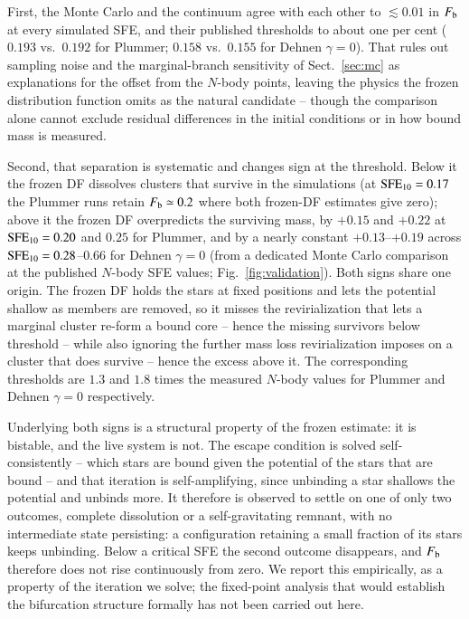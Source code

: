 \documentclass{aa}
\newcommand{\sfe}{{\rm SFE}}
\begin{document}
First, the Monte Carlo and the continuum agree with each other to
$\lesssim0.01$ in $F_{\rm b}$ at every simulated SFE, and their published
thresholds to about one per cent ($0.193$ vs.\ $0.192$ for Plummer;
$0.158$ vs.\ $0.155$ for Dehnen $\gamma=0$). That rules out sampling
noise and the marginal-branch sensitivity of Sect.~\ref{sec:mc} as
explanations for the offset from the $N$-body points, leaving the physics
the frozen distribution function omits as the natural candidate -- though
the comparison alone cannot exclude residual differences in the initial
conditions or in how bound mass is measured.

Second, that separation is systematic and changes sign at the
threshold. Below it the frozen DF dissolves clusters that survive in the
simulations (at $\sfe_{10}=0.17$ the Plummer runs retain
$F_{\rm b}\simeq0.2$ where both frozen-DF estimates give zero); above it
the frozen DF overpredicts the surviving mass, by $+0.15$ and $+0.22$ at
$\sfe_{10}=0.20$ and $0.25$ for Plummer, and by a nearly constant
$+0.13$--$+0.19$ across $\sfe_{10}=0.28$--$0.66$ for Dehnen $\gamma=0$
(from a dedicated Monte Carlo comparison at the published $N$-body SFE
values; Fig.~\ref{fig:validation}). Both signs share one origin. The frozen DF holds the stars at fixed
positions and lets the potential shallow as members are removed, so it
misses the revirialization that lets a marginal cluster re-form a bound
core -- hence the missing survivors below threshold -- while also
ignoring the further mass loss revirialization imposes on a cluster that
does survive -- hence the excess above it. The corresponding thresholds
are $1.3$ and $1.8$ times the measured $N$-body values for Plummer and
Dehnen $\gamma=0$ respectively.

Underlying both signs is a structural property of the frozen estimate:
it is bistable, and the live system is not. The escape condition is
solved self-consistently -- which stars are bound given the potential of
the stars that are bound -- and that iteration is self-amplifying, since
unbinding a star shallows the potential and unbinds more. It therefore
is observed to settle on one of only two outcomes, complete dissolution
or a self-gravitating remnant, with no intermediate state persisting: a
configuration retaining a small fraction of its stars keeps unbinding.
Below a critical SFE the second outcome disappears, and $F_{\rm b}$
therefore does not rise continuously from zero. We report this
empirically, as a property of the iteration we solve; the fixed-point
analysis that would establish the bifurcation structure formally has not
been carried out here.
\end{document}

